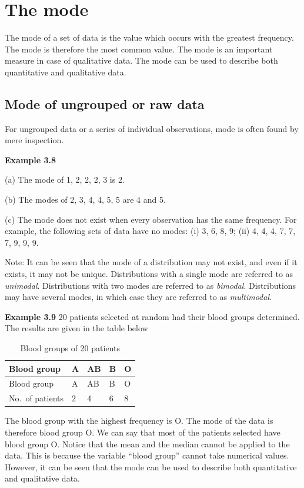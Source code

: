 \documentclass[
]{book}
\begin{document}
\hypertarget{the-mode}{%
\section{The mode}\label{the-mode}}

The mode of a set of data is the value which occurs with the greatest
frequency. The mode is therefore the most common value. The mode is an
important measure in case of qualitative data. The mode can be used to
describe both quantitative and qualitative data.

\hypertarget{mode-of-ungrouped-or-raw-data}{%
\subsection{Mode of ungrouped or raw data}\label{mode-of-ungrouped-or-raw-data}}

For ungrouped data or a series of individual observations, mode is often
found by mere inspection.

\textbf{Example 3.8}

(a) The mode of 1, 2, 2, 2, 3 is 2.

(b) The modes of 2, 3, 4, 4, 5, 5 are 4 and 5.

(c) The mode does not exist when every observation has the same frequency. For example, the following sets of data have no modes: (i) 3,
6, 8, 9; (ii) 4, 4, 4, 7, 7, 7, 9, 9, 9.

Note: It can be seen that the mode of a distribution may not exist, and
even if it exists, it may not be unique. Distributions with a single
mode are referred to as \emph{unimodal}. Distributions with two modes are
referred to as \emph{bimodal}. Distributions may have several modes, in which
case they are referred to as \emph{multimodal}.

\textbf{Example 3.9} 20 patients selected at random had their blood groups
determined. The results are given in the table below

\begin{longtable}[]{@{}lllll@{}}
\caption{\label{tab:Blood} Blood groups of 20 patients}\tabularnewline
\toprule
Blood group & A & AB & B & O \\
\midrule
\endfirsthead
\toprule
Blood group & A & AB & B & O \\
\midrule
\endhead
No.~of patients & 2 & 4 & 6 & 8 \\
\bottomrule
\end{longtable}

The blood group with the highest frequency is O. The mode of the data is
therefore blood group O. We can say that most of the patients selected
have blood group O. Notice that the mean and the median cannot be
applied to the data. This is because the variable ``blood group'' cannot
take numerical values. However, it can be seen that the mode can be used
to describe both quantitative and qualitative data.
\end{document}
